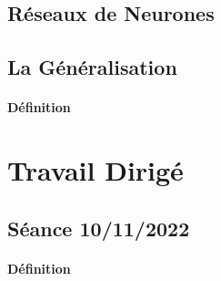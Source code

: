 \documentclass{article}
\begin{document}
\subsection{Réseaux de Neurones}


\subsection{La Généralisation}
\paragraph{Définition}


\section{Travail Dirigé}
\subsection{Séance 10/11/2022}
\paragraph{Définition}
\end{document}
